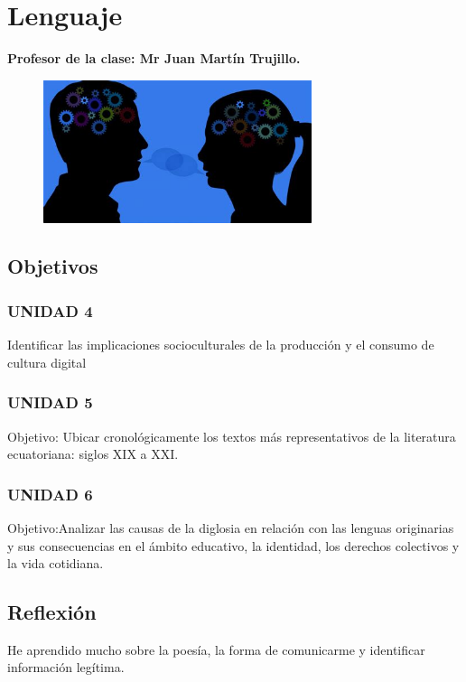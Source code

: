 \documentclass[a4paper, 12pt]{article}
\begin{document}
\section{Lenguaje}
\textbf{Profesor de la clase: Mr Juan Martín Trujillo.}

\begin{figure}[h]
  \includegraphics[width=0.7\textwidth, center]{lenguaje.jpeg}
\end{figure}

\subsection{Objetivos}
\subsubsection{UNIDAD 4}

Identificar las implicaciones socioculturales de la producción y el consumo de cultura digital

\subsubsection{UNIDAD 5}

Objetivo: Ubicar cronológicamente los textos más representativos de la literatura ecuatoriana: siglos XIX  a XXI.

\subsubsection{UNIDAD 6}

Objetivo:Analizar las causas de la diglosia en relación con las lenguas originarias y sus consecuencias en el ámbito educativo, la identidad, los derechos colectivos y la vida cotidiana.

\subsection{Reflexión}
He aprendido mucho sobre la poesía, la forma de comunicarme y identificar información legítima.
\end{document}
